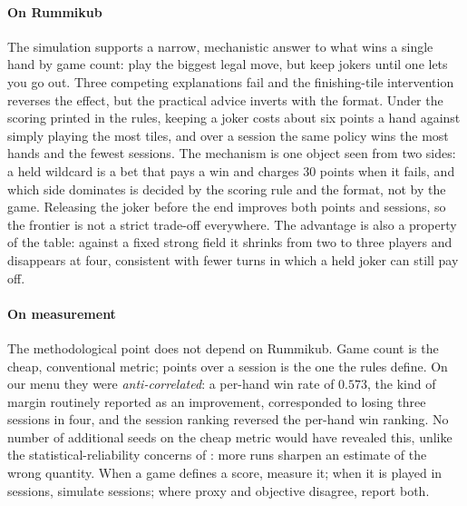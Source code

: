 \documentclass[10pt,journal,compsoc]{IEEEtran}
\begin{document}
\paragraph*{On Rummikub}
The simulation supports a narrow, mechanistic answer to what wins a single hand by game count: play the biggest legal move, but keep jokers until one lets you go out. Three competing explanations fail and the finishing-tile intervention reverses the effect, but the practical advice inverts with the format. Under the scoring printed in the rules, keeping a joker costs about six points a hand against simply playing the most tiles, and over a session the same policy wins the most hands and the fewest sessions. The mechanism is one object seen from two sides: a held wildcard is a bet that pays a win and charges $30$ points when it fails, and which side dominates is decided by the scoring rule and the format, not by the game. Releasing the joker before the end improves both points and sessions, so the frontier is not a strict trade-off everywhere. The advantage is also a property of the table: against a fixed strong field it shrinks from two to three players and disappears at four, consistent with fewer turns in which a held joker can still pay off.

\paragraph*{On measurement}
The methodological point does not depend on Rummikub. Game count is the cheap, conventional metric; points over a session is the one the rules define. On our menu they were \emph{anti-correlated}: a per-hand win rate of $0.573$, the kind of margin routinely reported as an improvement, corresponded to losing three sessions in four, and the session ranking reversed the per-hand win ranking. No number of additional seeds on the cheap metric would have revealed this, unlike the statistical-reliability concerns of \cite{agarwal2021}: more runs sharpen an estimate of the wrong quantity. When a game defines a score, measure it; when it is played in sessions, simulate sessions; where proxy and objective disagree, report both.
\end{document}
